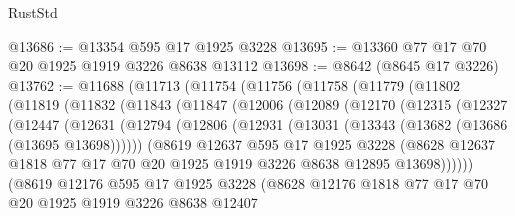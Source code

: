 \begin{lexlean}{RustStd}
\begin{coremodule}
@13686 := @13354 @595 @17 @1925 @3228
@13695 := @13360 @77 @17 @70 @20 @1925 @1919 @3226 @8638 @13112
@13698 := @8642 (@8645 @17 @3226)
@13762 := @11688
    (@11713
      (@11754
        (@11756
          (@11758
            (@11779
              (@11802
                (@11819
                  (@11832
                    (@11843
                      (@11847
                        (@12006
                          (@12089
                            (@12170
                              (@12315
                                (@12327
                                  (@12447
                                    (@12631
                                      (@12794
                                        (@12806
                                          (@12931
                                            (@13031 (@13343 (@13682 (@13686 (@13695 @13698))))))
                                          (@8619
                                            @12637
                                            @595
                                            @17
                                            @1925
                                            @3228
                                            (@8628
                                              @12637
                                              @1818
                                              @77
                                              @17
                                              @70
                                              @20
                                              @1925
                                              @1919
                                              @3226
                                              @8638
                                              @12895
                                              @13698))))))
                                  (@8619
                                    @12176
                                    @595
                                    @17
                                    @1925
                                    @3228
                                    (@8628
                                      @12176
                                      @1818
                                      @77
                                      @17
                                      @70
                                      @20
                                      @1925
                                      @1919
                                      @3226
                                      @8638
                                      @12407

\end{coremodule}
\end{lexlean}
